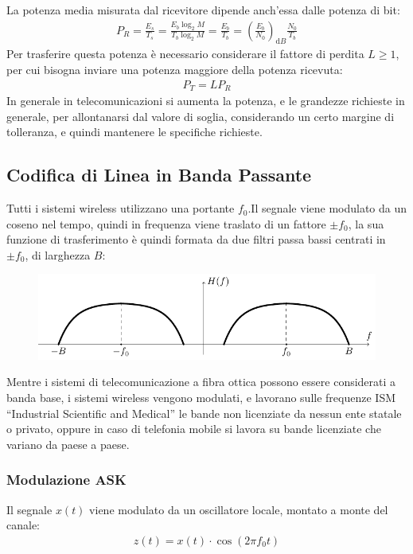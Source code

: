 \documentclass{article}
\newcommand{\df}{\mathrm{d}}
\numberwithin{equation}{subsection}
\begin{document}
La potenza media misurata dal ricevitore dipende anch'essa dalle potenza di bit:
\begin{gather*}
    P_R=\displaystyle\frac{E_s}{T_s}=\frac{E_b\log_2M}{T_b\log_2M}=\frac{E_b}{T_b}=\left(\frac{E_b}{N_0}\right)_{\df B}\frac{N_0}{T_b}
\end{gather*}
Per trasferire questa potenza è necessario considerare il fattore di perdita $L\geq 1$, per cui bisogna inviare una potenza maggiore della potenza ricevuta:
\begin{gather*}
    P_T=LP_R
\end{gather*}
In generale in telecomunicazioni si aumenta la potenza, e le grandezze richieste in generale, per allontanarsi dal valore di soglia, considerando un certo margine di 
tolleranza, e quindi mantenere le specifiche richieste. 

\subsection{Codifica di Linea in Banda Passante}
\label{sec:banda-passante}
Tutti i sistemi wireless utilizzano una portante $f_0$.Il segnale viene modulato da un coseno nel tempo, quindi in frequenza viene 
traslato di un fattore $\pm f_0$, la sua funzione di trasferimento è quindi formata da due filtri passa bassi centrati in $\pm f_0$, di larghezza $B$:
\begin{figure}[H]%
    \centering
    \includegraphics{portante.pdf}%
\end{figure}
Mentre i sistemi di telecomunicazione a fibra ottica possono essere considerati a banda base, i sistemi wireless vengono modulati, e lavorano sulle frequenze ISM ``Industrial Scientific and Medical'' 
le bande non licenziate da nessun ente statale o privato, oppure in caso di telefonia mobile si lavora su bande licenziate che variano da paese a paese. 

\subsubsection{Modulazione ASK}

Il segnale $x(t)$ viene modulato da un oscillatore locale, montato a monte del canale:
\begin{gather*}
    z(t)=x(t)\cdot\cos(2\pi f_0t)
\end{gather*}
\end{document}
